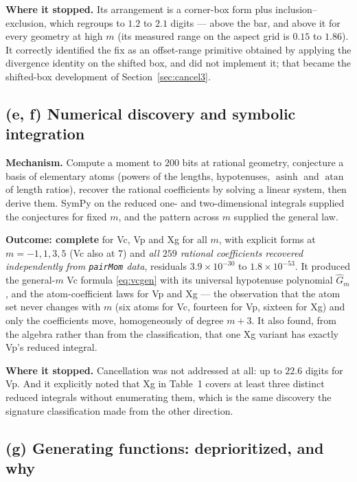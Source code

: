 \documentclass[11pt]{article}
\theoremstyle{remark}
\newcommand{\asinh}{\operatorname{asinh}}
\newcommand{\atan}{\operatorname{atan}}
\newcommand{\code}[1]{\texttt{#1}}
\begin{document}
\textbf{Where it stopped.} Its arrangement is a corner-box form plus inclusion--exclusion,
which regroups to $1.2$ to $2.1$ digits --- above the bar, and above it for every geometry
at high $m$ (its measured range on the aspect grid is $0.15$ to $1.86$). It correctly
identified the fix as an offset-range primitive obtained by applying the divergence
identity on the shifted box, and did not implement it; that became the shifted-box
development of Section~\ref{sec:cancel3}.

\subsection{(e, f) Numerical discovery and symbolic integration}

\textbf{Mechanism.} Compute a moment to $200$ bits at rational geometry, conjecture a basis
of elementary atoms (powers of the lengths, hypotenuses, $\asinh$ and $\atan$ of length
ratios), recover the rational coefficients by solving a linear system, then derive them.
SymPy on the reduced one- and two-dimensional integrals supplied the conjectures for fixed
$m$, and the pattern across $m$ supplied the general law.

\textbf{Outcome: complete} for Vc, Vp and Xg for all $m$, with explicit forms at
$m = -1, 1, 3, 5$ (Vc also at $7$) and \emph{all $259$ rational coefficients recovered
independently from \code{pairMom} data}, residuals $3.9\times10^{-30}$ to
$1.8\times10^{-53}$. It produced the general-$m$ Vc formula \eqref{eq:vcgen} with its
universal hypotenuse polynomial $\hat G_m$, and the atom-coefficient laws for Vp and Xg ---
the observation that the atom set never changes with $m$ (six atoms for Vc, fourteen for
Vp, sixteen for Xg) and only the coefficients move, homogeneously of degree $m+3$. It also
found, from the algebra rather than from the classification, that one Xg variant has
exactly Vp's reduced integral.

\textbf{Where it stopped.} Cancellation was not addressed at all: up to $22.6$ digits for
Vp. And it explicitly noted that Xg in Table~1 covers at least three distinct reduced
integrals without enumerating them, which is the same discovery the signature
classification made from the other direction.

\subsection{(g) Generating functions: deprioritized, and why}
\end{document}
